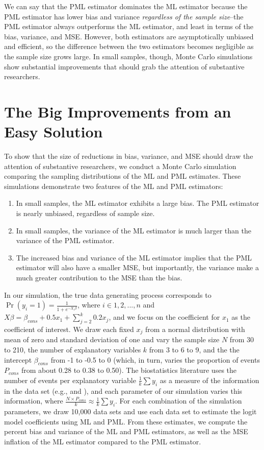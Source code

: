 \documentclass[12pt]{article}
\begin{document}
We can say that the PML estimator dominates the ML estimator because the PML estimator has lower bias and variance \textit{regardless of the sample size}--the PML estimator always outperforms the ML estimator, and least in terms of the bias, variance, and MSE.
However, both estimators are asymptotically unbiased and efficient, so the difference between the two estimators becomes negligible as the sample size grows large.
In small samples, though, Monte Carlo simulations show substantial improvements that should grab the attention of substantive researchers.

\section*{The Big Improvements from an Easy Solution}

To show that the size of reductions in bias, variance, and MSE should draw the attention of substantive researchers, we conduct a Monte Carlo simulation comparing the sampling distributions of the ML and PML estimates.
These simulations demonstrate two features of the ML and PML estimators:
\begin{enumerate}
\item In small samples, the ML estimator exhibits a large bias. The PML estimator is nearly unbiased, regardless of sample size.
\item In small samples, the variance of the ML estimator is much larger than the variance of the PML estimator.
\item The increased bias and variance of the ML estimator implies that the PML estimator will also have a smaller MSE, but importantly, the variance make a much greater contribution to the MSE than the bias.
\end{enumerate}

In our simulation, the true data generating process corresponds to $\Pr(y_i = 1) = \frac{1}{1 + e^{-X_i \beta}}$, where $i \in 1, 2,..., n$ and $X \beta = \beta_{cons} + 0.5 x_1 + \sum_{j = 2}^k 0.2 x_j$, and we focus on the coefficient for $x_1$ as the coefficient of interest.
We draw each fixed $x_j$ from a normal distribution with mean of zero and standard deviation of one and vary the sample size $N$ from 30 to 210, the number of explanatory variables $k$ from 3 to 6 to 9, and the the intercept $\beta_{cons}$ from -1 to -0.5 to 0 (which, in turn, varies the proportion of events $P_{cons}$ from about 0.28 to 0.38 to 0.50).
The biostatistics literature uses the number of events per explanatory variable $\frac{1}{k}\sum y_i$ as a measure of the information in the data set (e.g., \citealt{Peduzzietal1996} and \citealt{VittinghoffMcCulloch2007}), and each parameter of our simulation varies this information, where $ \frac{N \times P_{cons}}{k} \approx \frac{1}{k}\sum y_i$.
For each combination of the simulation parameters, we draw 10,000 data sets and use each data set to estimate the logit model coefficients using ML and PML. 
From these estimates, we compute the percent bias and variance of the ML and PML estimators, as well as the MSE inflation of the ML estimator compared to the PML estimator.
\end{document}
